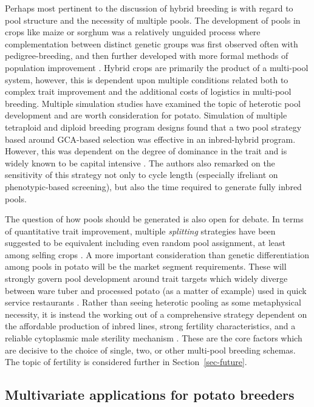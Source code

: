 \documentclass[
]{article}
\begin{document}
Perhaps most pertinent to the discussion of hybrid breeding is with
regard to pool structure and the necessity of multiple pools. The
development of pools in crops like maize or sorghum was a relatively
unguided process where complementation between distinct genetic groups
was first observed often with pedigree-breeding, and then further
developed with more formal methods of population improvement
\autocite{Duvick2004}. Hybrid crops are primarily the product of a
multi-pool system, however, this is dependent upon multiple conditions
related both to complex trait improvement and the additional costs of
logistics in multi-pool breeding. Multiple simulation studies have
examined the topic of heterotic pool development and are worth
consideration for potato. Simulation of multiple tetraploid and diploid
breeding program designs found that a two pool strategy based around
GCA-based selection was effective in an inbred-hybrid program. However,
this was dependent on the degree of dominance in the trait and is widely
known to be capital intensive \autocite{Labroo2023}. The authors also
remarked on the sensitivity of this strategy not only to cycle length
(especially ifreliant on phenotypic-based screening), but also the time
required to generate fully inbred pools.

The question of how pools should be generated is also open for debate.
In terms of quantitative trait improvement, multiple \emph{splitting}
strategies have been suggested to be equivalent including even random
pool assignment, at least among selfing crops \autocite{Cowling2020}. A
more important consideration than genetic differentiation among pools in
potato will be the market segment requirements. These will strongly
govern pool development around trait targets which widely diverge
between ware tuber and processed potato (as a matter of example) used in
quick service restaurants \autocite{Keijbets2008}. Rather than seeing
heterotic pooling as some metaphysical necessity, it is instead the
working out of a comprehensive strategy dependent on the affordable
production of inbred lines, strong fertility characteristics, and a
reliable cytoplasmic male sterility mechanism \autocite{McGrath2018}.
These are the core factors which are decisive to the choice of single,
two, or other multi-pool breeding schemas. The topic of fertility is
considered further in Section~\ref{sec-future}.

\subsection{Multivariate applications for potato
breeders}\label{sec-implications}
\end{document}
